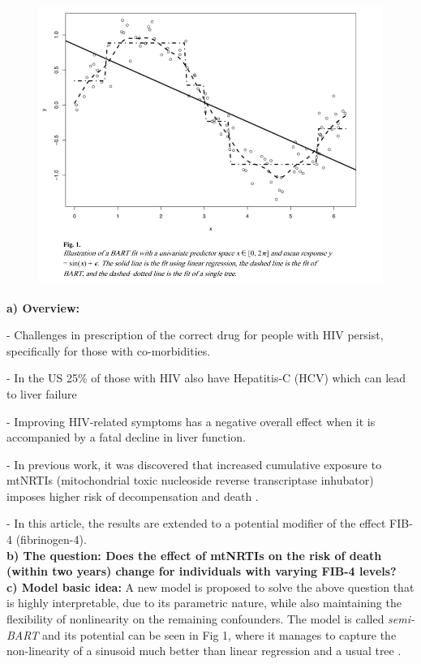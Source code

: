 \documentclass[a0paper,portrait]{baposter}
\begin{document}
\begin{poster}
{\begin{figure}
    \vspace{-10pt}
    \begin{center}
        \includegraphics[width=0.8\linewidth]{./images/figure1.png}
    \end{center}
\end{figure}

\textbf{a) Overview:} 

- Challenges in prescription of the correct drug for people with HIV persist, specifically for those with co-morbidities.

- In the US 25\% of those with HIV also have Hepatitis-C (HCV) which can lead to liver failure

- Improving HIV-related symptoms has a negative overall effect when it is accompanied by a fatal decline in liver function.

- In previous work, it was discovered that increased cumulative exposure to mtNRTIs (mitochondrial toxic nucleoside reverse transcriptase inhubator) imposes higher risk of decompensation and death \cite{}.

- In this article, the results are extended to a potential modifier of the effect FIB-4 (fibrinogen-4).
\\
\textbf{b) The question: Does the effect of mtNRTIs on the risk of death (within two years) change for individuals with varying FIB-4 levels?}
\\
\textbf{c) Model basic idea:} A new model is proposed to solve the above question that is highly interpretable, due to its parametric nature, while also
maintaining the flexibility of nonlinearity on the remaining confounders.
The model is called \textit{semi-BART} and its potential can be seen in Fig 1, where it manages to capture the non-linearity of a sinusoid much better than linear regression and a usual tree \cite{zeldow2019semiparametric}.
}


\end{poster}
\end{document}
